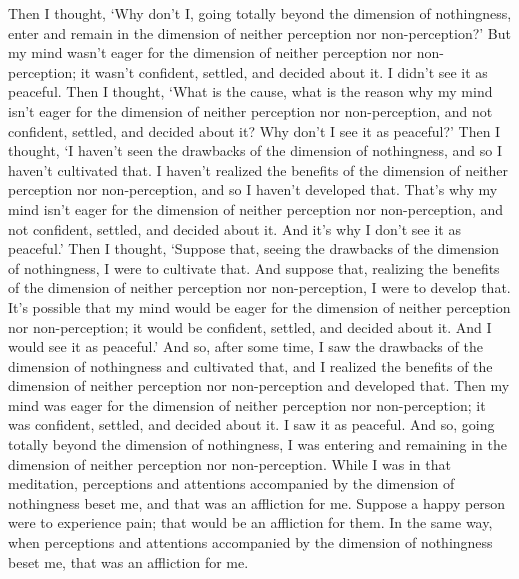\documentclass[12pt,openany]{book}%
\begin{document}
Then I thought, ‘Why don’t I, going totally beyond the dimension of nothingness, enter and remain in the dimension of neither perception nor non-perception?’ But my mind wasn’t eager for the dimension of neither perception nor non-perception; it wasn’t confident, settled, and decided about it. I didn’t see it as peaceful. Then I thought, ‘What is the cause, what is the reason why my mind isn’t eager for the dimension of neither perception nor non-perception, and not confident, settled, and decided about it? Why don’t I see it as peaceful?’ Then I thought, ‘I haven’t seen the drawbacks of the dimension of nothingness, and so I haven’t cultivated that. I haven’t realized the benefits of the dimension of neither perception nor non-perception, and so I haven’t developed that. That’s why my mind isn’t eager for the dimension of neither perception nor non-perception, and not confident, settled, and decided about it. And it’s why I don’t see it as peaceful.’ Then I thought, ‘Suppose that, seeing the drawbacks of the dimension of nothingness, I were to cultivate that. And suppose that, realizing the benefits of the dimension of neither perception nor non-perception, I were to develop that. It’s possible that my mind would be eager for the dimension of neither perception nor non-perception; it would be confident, settled, and decided about it. And I would see it as peaceful.’ And so, after some time, I saw the drawbacks of the dimension of nothingness and cultivated that, and I realized the benefits of the dimension of neither perception nor non-perception and developed that. Then my mind was eager for the dimension of neither perception nor non-perception; it was confident, settled, and decided about it. I saw it as peaceful. And so, going totally beyond the dimension of nothingness, I was entering and remaining in the dimension of neither perception nor non-perception. While I was in that meditation, perceptions and attentions accompanied by the dimension of nothingness beset me, and that was an affliction for me. Suppose a happy person were to experience pain; that would be an affliction for them. In the same way, when perceptions and attentions accompanied by the dimension of nothingness beset me, that was an affliction for me. 
\end{document}
